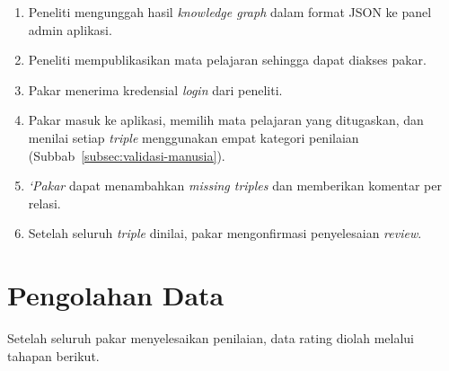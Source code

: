 \documentclass[main]{subfiles}
\begin{document}
\begin{enumerate}
  \item Peneliti mengunggah hasil \textit{knowledge graph} dalam format
        JSON ke panel admin aplikasi.
  \item Peneliti mempublikasikan mata pelajaran sehingga dapat diakses
        pakar.
  \item Pakar menerima kredensial \textit{login} dari
        peneliti.
  \item Pakar masuk ke aplikasi, memilih mata pelajaran yang
        ditugaskan, dan menilai setiap \textit{triple} menggunakan empat
        kategori penilaian (Subbab~\ref{subsec:validasi-manusia}).
  \item \textit{`Pakar} dapat menambahkan \textit{missing triples} dan
        memberikan komentar per relasi.
  \item Setelah seluruh \textit{triple} dinilai, pakar
        mengonfirmasi penyelesaian \textit{review}.
\end{enumerate}

\section{Pengolahan Data}\label{sec:pengolahan-data}

Setelah seluruh pakar menyelesaikan penilaian, data rating
diolah melalui tahapan berikut.
\end{document}
